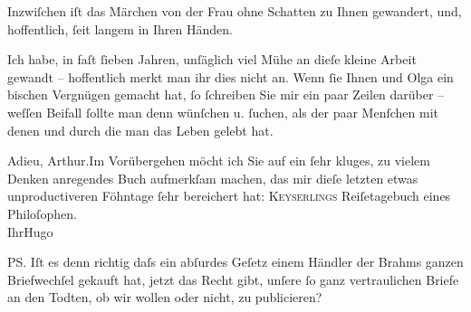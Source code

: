 \pstart
           Inzwiſchen iſt das Märchen von der Frau ohne
                  Schatten zu Ihnen gewandert, und, hoffentlich, ſeit langem in Ihren
               Händen.\pend
           
\pstart
           Ich habe, in faſt ſieben Jahren, unſäglich viel Mühe an dieſe kleine Arbeit gewandt –
               hoffentlich merkt man ihr dies nicht an. Wenn ſie Ihnen und Olga ein bischen Vergnügen gemacht hat, ſo ſchreiben Sie mir
               ein paar Zeilen darüber – weſſen Beifall ſollte man denn wünſchen u. ſuchen, als der
               paar Menſchen mit {\pb}denen und durch
               die man das Leben gelebt hat.\pend
           
\pstart
           Adieu, Arthur.\hspace*{1.5em}Im Vorübergehen möcht ich Sie auf ein
               ſehr kluges, zu vielem Denken anregendes Buch aufmerkſam machen, das mir dieſe
               letzten etwas unproductiveren Föhntage ſehr bereichert hat: \textsc{Keyserlings}{ }Reiſetagebuch eines
                  Philoſophen.{\\}Ihr\spacefill\mbox{Hugo}\pend
           
\pstart
           \noindent{}PS. Iſt es denn richtig daſs ein abſurdes Geſetz einem Händler der Brahms ganzen Briefwechſel gekauft hat, jetzt das Recht
                  gibt, unſere ſo ganz vertraulichen Briefe an den Todten, ob wir wollen oder nicht,
                  zu publicieren? \pend
           \endnumbering{}  
      